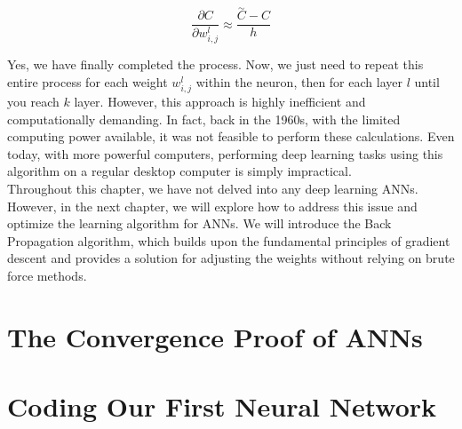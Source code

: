 \[
\frac{\partial C}{\partial w_{i, j}^l} \approx \frac{\overset{\sim}{C} - C}{h}
\]

Yes, we have finally completed the process. Now, we just need to repeat this entire process for each
weight $w_{i, j}^l$ within the neuron, then for each layer $l$ until you reach $k$ layer. However,
this approach is highly inefficient and computationally demanding. In fact, back in the 1960s, with the
limited computing power available, it was not feasible to perform these calculations. Even today, with
more powerful computers, performing deep learning tasks using this algorithm on a regular desktop computer
is simply impractical.\\

Throughout this chapter, we have not delved into any deep learning ANNs.
However, in the next chapter,
we will explore how to address this issue and optimize the learning algorithm for ANNs.
We will introduce the Back Propagation algorithm, which builds upon the fundamental principles of
gradient descent and provides a solution for adjusting the weights without relying on brute force methods.

\section{The Convergence Proof of ANNs}

\section{Coding Our First Neural Network}
